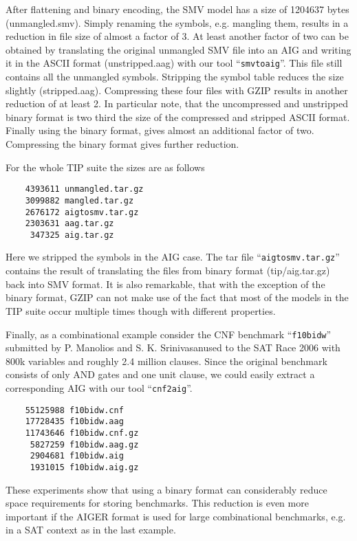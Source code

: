 \documentclass[10pt]{llncs}
\begin{document}
  After flattening and binary encoding, the SMV model has a size of 1204637
  bytes (unmangled.smv).  Simply renaming the symbols, e.g. mangling them,
  results in a reduction in file size of almost a factor of 3.  At least
  another factor of two can be obtained by translating the original
  unmangled SMV file into an AIG and writing it in the ASCII format
  (unstripped.aag) with our tool ``\texttt{smvtoaig}''.  This file still contains all
  the unmangled symbols.  Stripping the symbol table reduces the size
  slightly (stripped.aag).  Compressing these four files with GZIP results
  in another reduction of at least 2.  In particular note, that the
  uncompressed and unstripped binary format is two third the size of the
  compressed and stripped ASCII format.  Finally using the binary format,
  gives almost an additional factor of two.  Compressing the binary format
  gives further reduction.

  For the whole TIP suite the sizes are as follows

\begin{verbatim}
    4393611 unmangled.tar.gz
    3099882 mangled.tar.gz
    2676172 aigtosmv.tar.gz
    2303631 aag.tar.gz
     347325 aig.tar.gz
\end{verbatim}

  Here we stripped the symbols in the AIG case.  The tar file
  ``\texttt{aigtosmv.tar.gz}'' contains the result of translating the files from binary
  format (tip/aig.tar.gz) back into SMV format.  It is also remarkable, that
  with the exception of the binary format, GZIP can not make use of the fact
  that most of the models in the TIP suite occur multiple times though with
  different properties.

  Finally, as a combinational example consider the CNF benchmark
  ``\texttt{f10bidw}''
  submitted by P. Manolios and S. K. Srinivasanused to the SAT Race 2006
  with 800k variables and roughly 2.4 million clauses.  Since the original
  benchmark consists of only AND gates and one unit clause, we could easily
  extract a corresponding AIG with our tool ``\texttt{cnf2aig}''.

\begin{verbatim}
    55125988 f10bidw.cnf
    17728435 f10bidw.aag
    11743646 f10bidw.cnf.gz
     5827259 f10bidw.aag.gz
     2904681 f10bidw.aig
     1931015 f10bidw.aig.gz
\end{verbatim}

  These experiments show that using a binary format can considerably reduce
  space requirements for storing benchmarks.  This reduction is even more
  important if the AIGER format is used for large combinational benchmarks,
  e.g. in a SAT context as in the last example.
  
\end{document}
